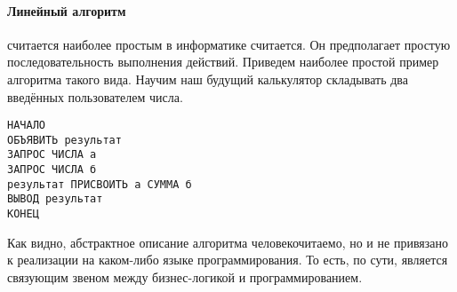 \documentclass[fontsize=14bp]{report}
\begin{document}
\paragraph{Линейный алгоритм} считается наиболее простым в информатике считается. Он предполагает простую последовательность выполнения действий. Приведем наиболее простой пример алгоритма такого вида. Научим наш будущий калькулятор складывать два введённых пользователем числа.
\begin{multicols}{2}
\begin{verbatim}
НАЧАЛО
ОБЪЯВИТЬ результат
ЗАПРОС ЧИСЛА а
ЗАПРОС ЧИСЛА б
результат ПРИСВОИТЬ а СУММА б
ВЫВОД результат
КОНЕЦ
\end{verbatim}
\columnbreak
Как видно, абстрактное описание алгоритма человекочитаемо, но и не привязано к реализации на каком-либо языке программирования. То есть, по сути, является связующим звеном между бизнес-логикой и программированием.
\end{multicols}
\end{document}
